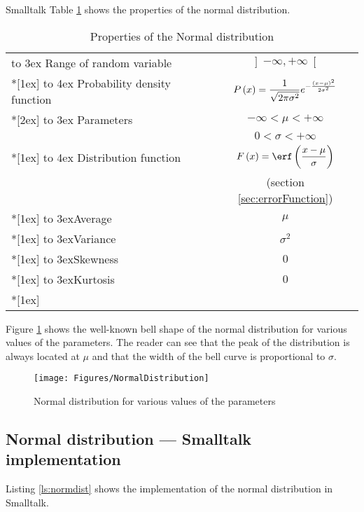 \begin{displaycode}{Smalltalk}
\noindent Table \ref{tb:normdist} shows the properties of the
normal distribution.
\begin{table}[h]
  \centering
  \caption{Properties of the Normal distribution}\label{tb:normdist}
\vspace{1 ex}
\begin{tabular}{|l|c|} \hline \vbox to 3ex{}
  Range of random variable & $\left]-\infty,+\infty\right[$\\
  *[1ex] \hline \vbox to 4ex{}
  Probability density function & $\displaystyle P\left(x\right)={1\over \sqrt{2\pi\sigma^2}}e^{-{\left(x-\mu\right)^2\over 2\sigma^2}}$ \\*[2ex]  \hline
  \vbox to 3ex{} Parameters & $-\infty<\mu<+\infty$ \\
  &$0<\sigma<+\infty$ \\*[1ex]  \hline \vbox to 4ex{}
  Distribution function & $\displaystyle F\left(x\right)=\erf\left({x-\mu\over\sigma}\right)$ \\
  &(\cf section \ref{sec:errorFunction}) \\*[1ex]  \hline
  \vbox to 3ex{}Average & $\mu$ \\*[1ex] \hline
  \vbox to 3ex{}Variance & $\sigma^2$ \\*[1ex] \hline
  \vbox to 3ex{}Skewness & $0$ \\*[1ex] \hline
  \vbox to 3ex{}Kurtosis & $0$ \\*[1ex] \hline
\end{tabular}
\end{table}
Figure \ref{fig:normDistr} shows the well-known bell shape of the
normal distribution for various values of the parameters. The
reader can see that the peak of the distribution is always located
at $\mu$ and that the width of the bell curve is proportional to
$\sigma$.
\begin{figure}
\centering\texttt{[image: Figures/NormalDistribution]}
\caption{Normal distribution for various values of the parameters
}\label{fig:normDistr}
\end{figure}

\subsection{Normal distribution --- Smalltalk implementation}
 Listing \ref{ls:normdist} shows the
implementation of the normal distribution in Smalltalk.


\end{displaycode}
